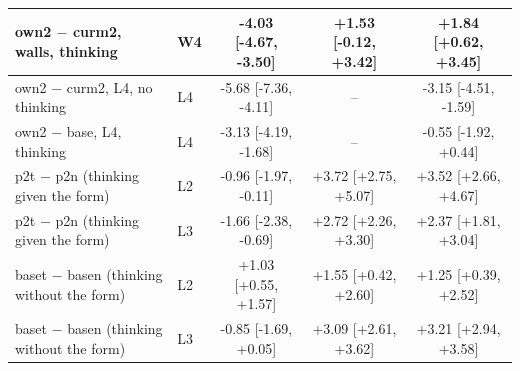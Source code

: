 \begin{tabular}{llccc}
own2 $-$ curm2, walls, thinking & W4 & -4.03 [-4.67, -3.50] & +1.53 [-0.12, +3.42] & +1.84 [+0.62, +3.45] \\
\midrule
own2 $-$ curm2, L4, no thinking & L4 & -5.68 [-7.36, -4.11] & -- & -3.15 [-4.51, -1.59] \\
\midrule
own2 $-$ base, L4, thinking & L4 & -3.13 [-4.19, -1.68] & -- & -0.55 [-1.92, +0.44] \\
\midrule
p2t $-$ p2n (thinking given the form) & L2 & -0.96 [-1.97, -0.11] & +3.72 [+2.75, +5.07] & +3.52 [+2.66, +4.67] \\
p2t $-$ p2n (thinking given the form) & L3 & -1.66 [-2.38, -0.69] & +2.72 [+2.26, +3.30] & +2.37 [+1.81, +3.04] \\
\midrule
baset $-$ basen (thinking without the form) & L2 & +1.03 [+0.55, +1.57] & +1.55 [+0.42, +2.60] & +1.25 [+0.39, +2.52] \\
baset $-$ basen (thinking without the form) & L3 & -0.85 [-1.69, +0.05] & +3.09 [+2.61, +3.62] & +3.21 [+2.94, +3.58] \\
\bottomrule
\end{tabular}
